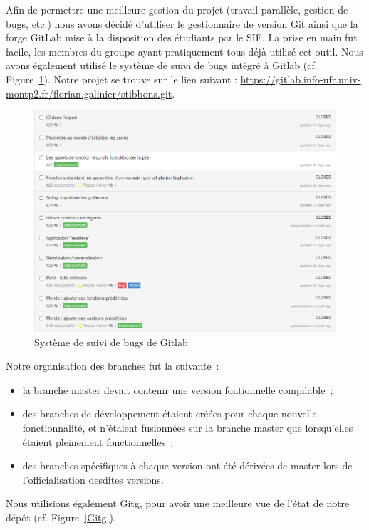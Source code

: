 Afin de permettre une meilleure gestion du projet (travail parallèle, gestion de bugs, etc.) nous avons décidé d'utiliser le gestionnaire de version Git ainsi que la forge GitLab mise à la disposition des étudiants par le SIF.
La prise en main fut facile, les membres du groupe ayant pratiquement tous déjà utilisé cet outil. Nous avons également utilisé le système de suivi de bugs intégré à Gitlab (cf. Figure~\ref{bugs}).
Notre projet se trouve sur le lien suivant : \url{https://gitlab.info-ufr.univ-montp2.fr/florian.galinier/stibbons.git}.
\begin{figure}[h]
\centering
\includegraphics[scale=0.35]{doc/gestionProjet/bugs.png}
\caption{\label{bugs} Système de suivi de bugs de Gitlab}
\end{figure}

Notre organisation des branches fut la suivante~:
\begin{itemize}
\item la branche master devait contenir une version fontionnelle compilable~;
\item des branches de développement étaient créées pour chaque nouvelle fonctionnalité, et n'étaient fusionnées sur la branche master que lorsqu'elles étaient pleinement fonctionnelles~;
\item des branches spécifiques à chaque version ont été dérivées de master lors de l'officialisation desdites versions.
\end{itemize}

Nous utilisions également Gitg, pour avoir une meilleure vue de l'état de notre dépôt (cf. Figure~\ref{Gitg}).

